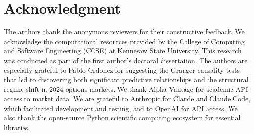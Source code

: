 \documentclass[12pt,letterpaper]{article}
\begin{document}








\section*{Acknowledgment}
The authors thank the anonymous reviewers for their constructive feedback. We acknowledge the computational resources provided by the College of Computing and Software Engineering (CCSE) at Kennesaw State University. This research was conducted as part of the first author's doctoral dissertation.
The authors are especially grateful to Pablo Ordonez for suggesting the Granger causality tests that led to discovering both significant predictive relationships and the structural regime shift in 2024 options markets.
We thank Alpha Vantage for academic API access to market data. We are grateful to Anthropic for Claude and Claude Code, which facilitated development and testing, and to OpenAI for API access. We also thank the open-source Python scientific computing ecosystem for essential libraries.



\end{document}
